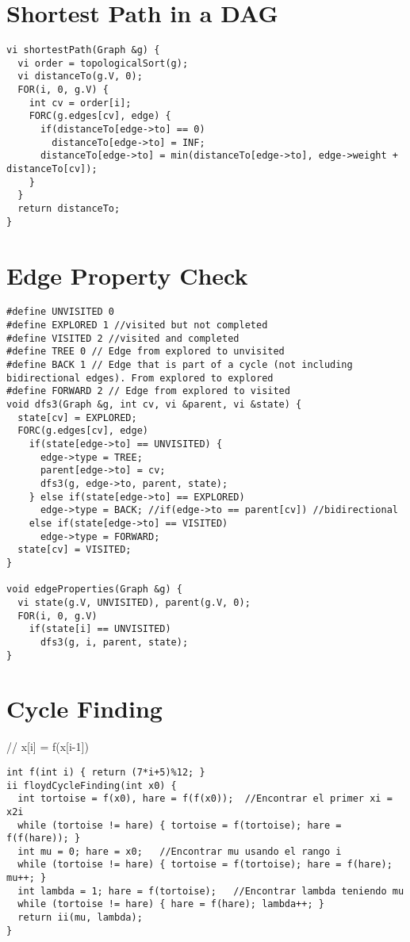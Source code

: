 \documentclass[11pt, oneside]{article}
\begin{document}
\section{Shortest Path in a DAG}
\begin{lstlisting}
vi shortestPath(Graph &g) {
  vi order = topologicalSort(g);
  vi distanceTo(g.V, 0);
  FOR(i, 0, g.V) {
    int cv = order[i];
    FORC(g.edges[cv], edge) {
      if(distanceTo[edge->to] == 0)
        distanceTo[edge->to] = INF;
      distanceTo[edge->to] = min(distanceTo[edge->to], edge->weight + distanceTo[cv]);
    }
  }
  return distanceTo;
}

\end{lstlisting}
\section{Edge Property Check}
\begin{lstlisting}
#define UNVISITED 0 
#define EXPLORED 1 //visited but not completed
#define VISITED 2 //visited and completed
#define TREE 0 // Edge from explored to unvisited
#define BACK 1 // Edge that is part of a cycle (not including bidirectional edges). From explored to explored
#define FORWARD 2 // Edge from explored to visited
void dfs3(Graph &g, int cv, vi &parent, vi &state) {
  state[cv] = EXPLORED;
  FORC(g.edges[cv], edge)
    if(state[edge->to] == UNVISITED) {
      edge->type = TREE;
      parent[edge->to] = cv;
      dfs3(g, edge->to, parent, state);
    } else if(state[edge->to] == EXPLORED)
      edge->type = BACK; //if(edge->to == parent[cv]) //bidirectional
    else if(state[edge->to] == VISITED)
      edge->type = FORWARD;
  state[cv] = VISITED;
}

void edgeProperties(Graph &g) {
  vi state(g.V, UNVISITED), parent(g.V, 0);
  FOR(i, 0, g.V)
    if(state[i] == UNVISITED)
      dfs3(g, i, parent, state);
}

\end{lstlisting}
\section{Cycle Finding}
// x[i] = f(x[i-1])
\begin{lstlisting}
int f(int i) { return (7*i+5)%12; }
ii floydCycleFinding(int x0) {
  int tortoise = f(x0), hare = f(f(x0));  //Encontrar el primer xi = x2i
  while (tortoise != hare) { tortoise = f(tortoise); hare = f(f(hare)); }
  int mu = 0; hare = x0;   //Encontrar mu usando el rango i
  while (tortoise != hare) { tortoise = f(tortoise); hare = f(hare); mu++; }
  int lambda = 1; hare = f(tortoise);   //Encontrar lambda teniendo mu
  while (tortoise != hare) { hare = f(hare); lambda++; }
  return ii(mu, lambda);
}

\end{lstlisting}
\end{document}

